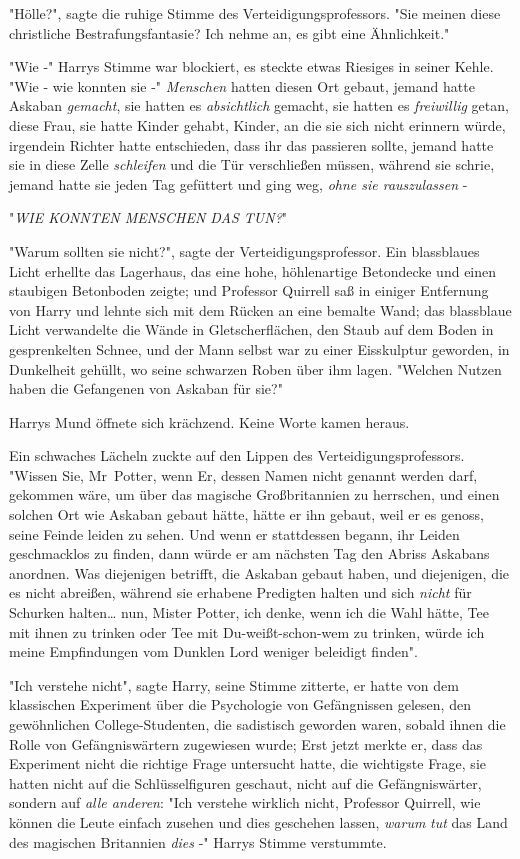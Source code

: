 {"Hölle?", sagte die ruhige Stimme des Verteidigungsprofessors. "Sie meinen diese christliche Bestrafungsfantasie? Ich nehme an, es gibt eine Ähnlichkeit."

"Wie -" Harrys Stimme war blockiert, es steckte etwas Riesiges in seiner Kehle. "Wie - wie konnten sie -" \emph{Menschen} hatten diesen Ort gebaut, jemand hatte Askaban \emph{gemacht}, sie hatten es \emph{absichtlich} gemacht, sie hatten es \emph{freiwillig} getan, diese Frau, sie hatte Kinder gehabt, Kinder, an die sie sich nicht erinnern würde, irgendein Richter hatte entschieden, dass ihr das passieren sollte, jemand hatte sie in diese Zelle \emph{schleifen} und die Tür verschließen müssen, während sie schrie, jemand hatte sie jeden Tag gefüttert und ging weg, \emph{ohne sie rauszulassen} -

"\emph{WIE KONNTEN MENSCHEN DAS TUN?}"

"Warum sollten sie nicht?", sagte der Verteidigungsprofessor. Ein blassblaues Licht erhellte das Lagerhaus, das eine hohe, höhlenartige Betondecke und einen staubigen Betonboden zeigte; und Professor Quirrell saß in einiger Entfernung von Harry und lehnte sich mit dem Rücken an eine bemalte Wand; das blassblaue Licht verwandelte die Wände in Gletscherflächen, den Staub auf dem Boden in gesprenkelten Schnee, und der Mann selbst war zu einer Eisskulptur geworden, in Dunkelheit gehüllt, wo seine schwarzen Roben über ihm lagen. "Welchen Nutzen haben die Gefangenen von Askaban für sie?"

Harrys Mund öffnete sich krächzend. Keine Worte kamen heraus.

Ein schwaches Lächeln zuckte auf den Lippen des Verteidigungsprofessors. "Wissen Sie, Mr~Potter, wenn Er, dessen Namen nicht genannt werden darf, gekommen wäre, um über das magische Großbritannien zu herrschen, und einen solchen Ort wie Askaban gebaut hätte, hätte er ihn gebaut, weil er es genoss, seine Feinde leiden zu sehen. Und wenn er stattdessen begann, ihr Leiden geschmacklos zu finden, dann würde er am nächsten Tag den Abriss Askabans anordnen. Was diejenigen betrifft, die Askaban gebaut haben, und diejenigen, die es nicht abreißen, während sie erhabene Predigten halten und sich \emph{nicht} für Schurken halten… nun, Mister Potter, ich denke, wenn ich die Wahl hätte, Tee mit ihnen zu trinken oder Tee mit Du-weißt-schon-wem zu trinken, würde ich meine Empfindungen vom Dunklen Lord weniger beleidigt finden".

"Ich verstehe nicht", sagte Harry, seine Stimme zitterte, er hatte von dem klassischen Experiment über die Psychologie von Gefängnissen gelesen, den gewöhnlichen College-Studenten, die sadistisch geworden waren, sobald ihnen die Rolle von Gefängniswärtern zugewiesen wurde; Erst jetzt merkte er, dass das Experiment nicht die richtige Frage untersucht hatte, die wichtigste Frage, sie hatten nicht auf die Schlüsselfiguren geschaut, nicht auf die Gefängniswärter, sondern auf \emph{alle anderen}: "Ich verstehe wirklich nicht, Professor Quirrell, wie können die Leute einfach zusehen und dies geschehen lassen, \emph{warum} \emph{tut} das Land des magischen Britannien \emph{dies} -" Harrys Stimme verstummte.

}
